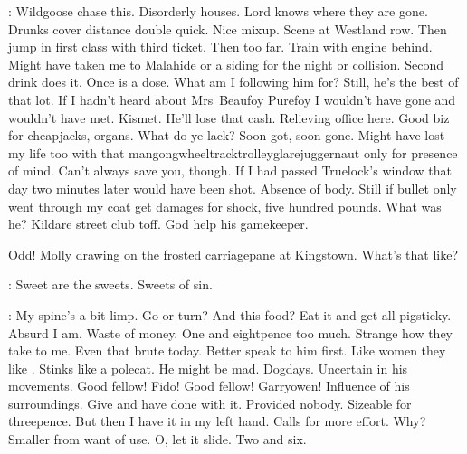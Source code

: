 
\Bloom:
Wildgoose chase this.
Disorderly houses.
Lord knows where they are gone.
Drunks cover distance double quick.
Nice mixup.
Scene at Westland row.
Then jump in first class with third ticket.
Then too far.
Train with engine behind.
Might have taken me to Malahide or a siding for the night or collision.
Second drink does it.
Once is a dose.
What am I following him for?
Still, he's the best of that lot.
If I hadn't heard about Mrs~Beaufoy Purefoy
I wouldn't have gone and wouldn't have met.
Kismet.
He'll lose that cash.
Relieving office here.
Good biz for cheapjacks, organs.
What do ye lack? Soon got, soon gone.
Might have lost my life too
with that mangongwheeltracktrolleyglarejuggernaut
only for presence of mind.
Can't always save you, though.
If I had passed Truelock's window that day
two minutes later would have been shot.
Absence of body.
Still if bullet only went through my coat
get damages for shock, five hundred pounds.
What was he?
Kildare street club toff.
God help his gamekeeper.

%
Odd! Molly drawing on the frosted carriagepane at Kingstown.
What's that like?

\Wreaths:
Sweet are the sweets.
Sweets of sin.

\Bloom:
My spine's a bit limp.
Go or turn?
And this food? Eat it and get all pigsticky.
Absurd I am.
Waste of money.
One and eightpence too much.
Strange how they take to me.
Even that brute today.
Better speak to him first.
Like women they like .
Stinks like a polecat.
He might be mad.
Dogdays.
Uncertain in his movements.
Good fellow! Fido!
Good fellow! Garryowen!
Influence of his surroundings.
Give and have done with it.
Provided nobody.
Sizeable for threepence.
But then I have it in my left hand.
Calls for more effort.
Why? Smaller from want of use.
O, let it slide.
Two and six.

